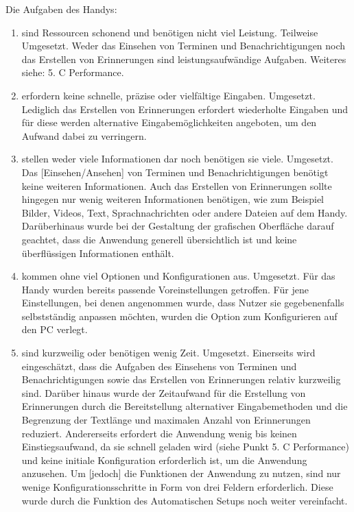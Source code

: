 \begin{enumerate}
\begin{enumerate}[label*={\arabic*}]
		\end{enumerate}
		\myNewSection%
		Die Aufgaben des Handys:%
		\begin{enumerate}[label*={\arabic*}]
			\item sind Ressourcen schonend und benötigen nicht viel Leistung.\newline%
				Teilweise Umgesetzt. Weder das Einsehen von Terminen und Benachrichtigungen noch das Erstellen von Erinnerungen sind leistungsaufwändige Aufgaben. Weiteres siehe: 5. C Performance.
			\item erfordern keine schnelle, präzise oder vielfältige Eingaben.\newline%
				Umgesetzt. Lediglich das Erstellen von Erinnerungen erfordert wiederholte Eingaben und für diese werden alternative Eingabemöglichkeiten angeboten, um den Aufwand dabei zu verringern. 
			\item stellen weder viele Informationen dar noch benötigen sie viele.\newline%
				Umgesetzt. Das [Einsehen/Ansehen] von Terminen und Benachrichtigungen benötigt keine weiteren Informationen. Auch das Erstellen von Erinnerungen sollte hingegen nur wenig weiteren Informationen benötigen, wie zum Beispiel Bilder, Videos, Text, Sprachnachrichten oder andere Dateien auf dem Handy. Darüberhinaus wurde bei der Gestaltung der grafischen Oberfläche darauf geachtet, dass die Anwendung generell übersichtlich ist und keine überflüssigen Informationen enthält.%
			\item kommen ohne viel Optionen und Konfigurationen aus.\newline%
				Umgesetzt. Für das Handy wurden bereits passende Voreinstellungen getroffen. Für jene Einstellungen, bei denen angenommen wurde, dass Nutzer sie gegebenenfalls selbstständig anpassen möchten, wurden die Option zum Konfigurieren auf den PC verlegt.
			\item sind kurzweilig oder benötigen wenig Zeit.\newline%
				Umgesetzt. Einerseits wird eingeschätzt, dass die Aufgaben des Einsehens von Terminen und Benachrichtigungen sowie das Erstellen von Erinnerungen relativ kurzweilig sind. Darüber hinaus wurde der Zeitaufwand für die Erstellung von Erinnerungen durch die Bereitstellung alternativer Eingabemethoden und die Begrenzung der Textlänge und maximalen Anzahl von Erinnerungen reduziert. Andererseits erfordert die Anwendung wenig bis keinen Einstiegsaufwand, da sie schnell geladen wird (siehe Punkt 5. C Performance) und keine initiale Konfiguration erforderlich ist, um die Anwendung anzusehen. Um [jedoch] die Funktionen der Anwendung zu nutzen, sind nur wenige Konfigurationsschritte in Form von drei Feldern erforderlich. Diese wurde durch die Funktion des \glqq Automatischen Setups\grqq{} noch weiter vereinfacht.

\end{enumerate}
\end{enumerate}
